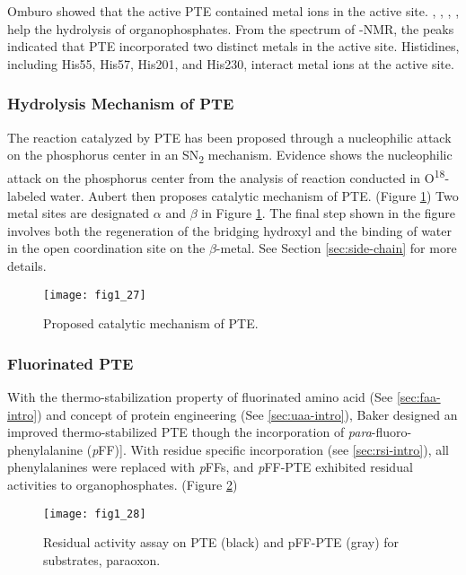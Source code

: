 \begin{refsection}
Omburo  showed that the active PTE contained metal ions in the
active site. , , , ,
 help the hydrolysis of organophosphates\cite{Omburo1992a}. From
the spectrum of -NMR, the peaks indicated that PTE incorporated
two distinct metals in the active site\cite{Omburo1993}. Histidines, including
His55, His57, His201, and His230, interact metal ions at the active
site\cite{Benning2001a}. 

\subsubsection{Hydrolysis Mechanism of PTE}

The reaction catalyzed by PTE has been proposed through a nucleophilic attack
on the phosphorus center in an SN\textsubscript{2} mechanism\cite{Lewis1988}.
Evidence shows the nucleophilic attack on the phosphorus center from the
analysis of reaction conducted in O\textsuperscript{18}-labeled
water\cite{Lewis1988}.  Aubert  then proposes catalytic mechanism
of PTE\cite{Aubert2004}.  (Figure \ref{fig:pte-mechanism}) Two metal sites are
designated $\alpha$ and $\beta$ in Figure
\ref{fig:pte-mechanism}\cite{Aubert2004}. The final step shown in the figure
involves both the regeneration of the bridging hydroxyl and the binding of
water in the open coordination site on the $\beta$-metal. See Section
\ref{sec:side-chain} for more details. 
\begin{figure}[h!] \centering \texttt{[image: fig1\_27]}
    \caption[Proposed catalytic mechanism of PTE.]{Proposed catalytic mechanism
        of PTE\cite{Aubert2004}.} \label{fig:pte-mechanism} 
\end{figure}

\subsubsection{Fluorinated PTE}

With the thermo-stabilization property of fluorinated amino acid (See
\ref{sec:faa-intro}) and concept of protein engineering (See \ref{sec:uaa-intro}),
Baker  designed an improved thermo-stabilized PTE though the
incorporation of \emph{para}-fluoro-phenylalanine
(\emph{p}FF)]\cite{Baker2011b}. With residue specific incorporation (see
\ref{sec:rsi-intro}), all phenylalanines were replaced with \emph{p}FFs, and
\emph{p}FF-PTE exhibited residual activities to organophosphates. (Figure
\ref{fig:PJB})
\begin{figure}[h!] \centering \texttt{[image: fig1\_28]}
    \caption[Residual activity assay on PTE (black) and pFF-PTE (gray) for
    substrates, paraoxon.]{Residual activity assay on PTE (black) and pFF-PTE
        (gray) for substrates, paraoxon\cite{Baker2011b}.} \label{fig:PJB}
\end{figure}



\end{refsection}
